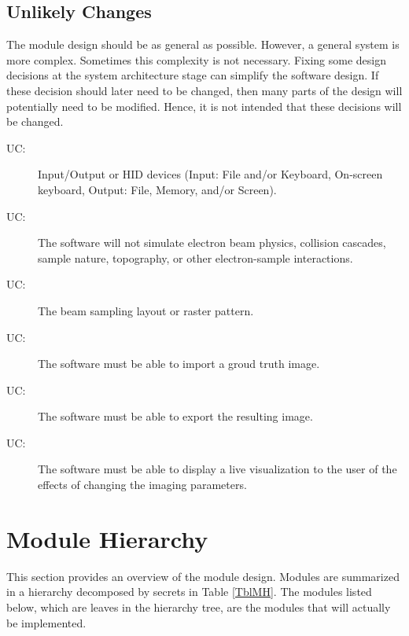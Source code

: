 \documentclass[12pt, titlepage]{article}
\newcounter{ucnum}
\newcommand{\uctheucnum}{UC\theucnum}
\begin{document}
\subsection{Unlikely Changes} \label{SecUchange}

The module design should be as general as possible. However, a general system is
more complex. Sometimes this complexity is not necessary. Fixing some design
decisions at the system architecture stage can simplify the software design. If
these decision should later need to be changed, then many parts of the design
will potentially need to be modified. Hence, it is not intended that these
decisions will be changed.

\begin{description}
  \item[ \uctheucnum \label{UC_IO}:] Input/Output or HID devices
    (Input: File and/or Keyboard, On-screen keyboard, Output: File, Memory, and/or Screen).
  \item[ \uctheucnum \label{UC_physics}:] The software will not
    simulate electron beam physics, collision cascades, sample nature, topography, 
    or other electron-sample interactions.
  \item[ \uctheucnum \label{UC_layout}:] The beam sampling
    layout or raster pattern.
  \item[ \uctheucnum \label{UC_import}:] The software must
    be able to import a groud truth image.
  \item[ \uctheucnum \label{UC_export}:] The software must
    be able to export the resulting image.
  \item[ \uctheucnum \label{UC_visualize}:] The software must be able
    to display a live visualization to the user of the effects of changing the imaging parameters.
\end{description}

\section{Module Hierarchy} \label{SecMH}

This section provides an overview of the module design. Modules are summarized
in a hierarchy decomposed by secrets in Table \ref{TblMH}. The modules listed
below, which are leaves in the hierarchy tree, are the modules that will
actually be implemented.
\end{document}
